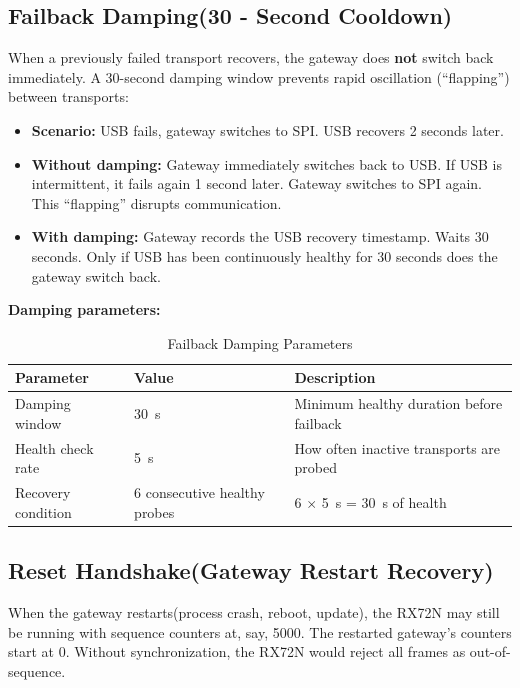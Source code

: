 \subsection{Failback Damping(30 - Second Cooldown)}
\label{subsec : failback - damping}

When a previously failed transport recovers,
    the gateway does \textbf{not
}
switch back immediately. A 30-second damping window prevents rapid oscillation (``flapping'') between transports:

\begin{itemize}[leftmargin=1.5em,topsep=4pt,itemsep=2pt]
    \item \textbf{Scenario:} USB fails, gateway switches to SPI. USB recovers 2 seconds later.
    \item \textbf{Without damping:} Gateway immediately switches back to USB. If USB is intermittent, it fails again 1 second later. Gateway switches to SPI again. This ``flapping'' disrupts communication.
    \item \textbf{With damping:} Gateway records the USB recovery timestamp. Waits 30 seconds. Only if USB has been continuously healthy for 30 seconds does the gateway switch back.
\end{itemize}

\textbf{Damping parameters:}

\begin{table}[H]
\centering
\caption { Failback Damping Parameters}
\label {
tab:
  damping - params
}
\begin{tabular} { l l l}
\toprule
\textbf{Parameter} & \textbf{Value} & \textbf{Description}
\\
\midrule Damping window & 30\,
    s &Minimum healthy duration before failback \\
Health check rate & 5\,
    s &How often inactive transports are probed \\
Recovery condition &
        6 consecutive healthy probes & 6 $\times$ 5\,
    s = 30\, s of health \\
\bottomrule
\end{tabular}
\end{table}

\subsection{Reset Handshake(Gateway Restart Recovery)}
\label{subsec : reset - handshake}

When the gateway
restarts(process crash, reboot, update),
    the RX72N may still be running with sequence counters at, say,
    5000. The restarted gateway's counters start at 0. Without synchronization, the RX72N would reject all frames as out-of-sequence.

